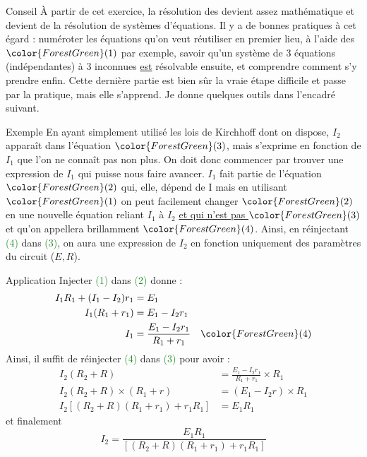 \documentclass[../main/main.tex]{subfiles}
\begin{document}
\begin{tcbraster}[raster columns=2, raster equal height=rows]
    \begin{NCimpo}{Conseil}
        À partir de cet exercice, la résolution des devient assez
        mathématique et devient de la résolution de systèmes d'équations. Il y a
        de bonnes pratiques à cet égard : numéroter les équations qu'on veut
        réutiliser en premier lieu, à l'aide des $\color{ForestGreen}(1)$ par
        exemple, savoir qu'un système de 3 équations (indépendantes) à 3
        inconnues \underline{est} résolvable ensuite, et comprendre comment s'y
        prendre enfin. Cette dernière partie est bien sûr la vraie étape
        difficile et passe par la pratique, mais elle s'apprend. Je donne
        quelques outils dans l'encadré suivant.
    \end{NCimpo}
    \begin{NCrema}{Exemple}
        En ayant simplement utilisé les lois de Kirchhoff dont on dispose, $I_2$
        apparaît dans l'équation $ \color{ForestGreen}(3)$, mais s'exprime en
        fonction de $I_1$ que l'on ne connaît pas non plus. On doit donc
        commencer par trouver une expression de $I_1$ qui puisse nous faire
        avancer. $I_1$ fait partie de l'équation $\color{ForestGreen}(2)$ qui,
        elle, dépend de I mais en utilisant $\color{ForestGreen}(1)$ on peut
        facilement changer $ \color{ForestGreen}(2)$ en une nouvelle équation
        reliant $I_1$ à $I_2$ \underline{et qui n'est pas $\color{ForestGreen}
        (3)$} et qu'on appellera brillamment $ \color{ForestGreen}(4)$. Ainsi, 
        en réinjectant \textcolor{ForestGreen}{(4)} dans
        \textcolor{ForestGreen}{(3)}, on aura une expression de $I_2$ en
        fonction uniquement des paramètres du circuit ($E, R$).
    \end{NCrema}
\end{tcbraster}

\begin{center}
    \begin{NCexem}[width=.7\linewidth]{Application}
        Injecter \textcolor{ForestGreen}{(1)} dans \textcolor{ForestGreen}{(2)}
        donne :
        \begin{align*}
            I_1R_1 + (I_1-I_2)r_1 &= E_1\\
            I_1(R_1+r_1) &= E_1-I_2r_1\\
            I_1 &= \frac{E_1 - I_2r_1}{R_1 + r_1} \quad \color{ForestGreen}(4)
        \end{align*}
        Ainsi, il suffit de réinjecter \textcolor{ForestGreen}{(4)} dans
        \textcolor{ForestGreen}{(3)} pour avoir :
        \begin{align*}
            I_2(R_2+R) &= \frac{E_1 - I_2r_1}{R_1 + r_1}\times R_1\\
            I_2(R_2+R)\times(R_1+r) &= (E_1-I_2r)\times R_1\\
            I_2 \left[ (R_2+R)(R_1+r_1)+r_1R_1 \right] &= E_1R_1
        \end{align*}
        et finalement
        \[\boxed{I_2 = \frac{E_1R_1}{\left[ (R_2+R)(R_1+r_1)+r_1R_1 \right]}}\]
    \end{NCexem}
\end{center}
\end{document}

